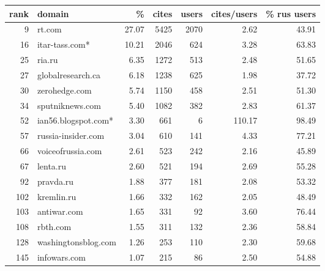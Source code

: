 \begin{tabular}{rlrrrrr}
\toprule
rank & domain &       \% &  cites &  users &  cites/users &  \% rus users \\
\midrule
9                &                         rt.com &   27.07 &   5425 &   2070 &         2.62 &        43.91 \\
16               &                 itar-tass.com* &   10.21 &   2046 &    624 &         3.28 &        63.83 \\
25               &                         ria.ru &    6.35 &   1272 &    513 &         2.48 &        51.65 \\
27               &              globalresearch.ca &    6.18 &   1238 &    625 &         1.98 &        37.72 \\
30               &                  zerohedge.com &    5.74 &   1150 &    458 &         2.51 &        51.30 \\
34               &                sputniknews.com &    5.40 &   1082 &    382 &         2.83 &        61.37 \\
52               &            ian56.blogspot.com* &    3.30 &    661 &      6 &       110.17 &        98.49 \\
57               &             russia-insider.com &    3.04 &    610 &    141 &         4.33 &        77.21 \\
66               &              voiceofrussia.com &    2.61 &    523 &    242 &         2.16 &        45.89 \\
67               &                       lenta.ru &    2.60 &    521 &    194 &         2.69 &        55.28 \\
92               &                      pravda.ru &    1.88 &    377 &    181 &         2.08 &        53.32 \\
102              &                     kremlin.ru &    1.66 &    332 &    162 &         2.05 &        48.49 \\
103              &                    antiwar.com &    1.65 &    331 &     92 &         3.60 &        76.44 \\
108              &                       rbth.com &    1.55 &    311 &    132 &         2.36 &        58.84 \\
128              &            washingtonsblog.com &    1.26 &    253 &    110 &         2.30 &        59.68 \\
145              &                   infowars.com &    1.07 &    215 &     86 &         2.50 &        54.88 \\

\end{tabular}
